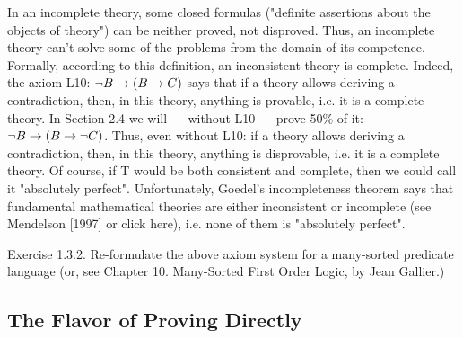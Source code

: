 In an incomplete theory, some closed formulas ("definite assertions about the objects of theory") can be
neither proved, not disproved. Thus, an incomplete theory can't solve some of the problems from the
domain of its competence.
Formally, according to this definition, an inconsistent theory is complete. Indeed, the axiom L10:
\(\neg B\rightarrow (B\rightarrow C)\) says that if a theory allows deriving a contradiction, then, in this theory, anything is
provable, i.e. it is a complete theory. In Section 2.4 we will --- without L10 --- prove 50\% of it:
\(\neg B\rightarrow (B\rightarrow \neg C)\). Thus, even without L10: if a theory allows deriving a contradiction, then, in this theory,
anything is disprovable, i.e. it is a complete theory.
Of course, if T would be both consistent and complete, then we could call it "absolutely perfect".
Unfortunately, Goedel's incompleteness theorem says that fundamental mathematical theories are
either inconsistent or incomplete (see Mendelson [1997] or click here), i.e. none of them is "absolutely
perfect".

Exercise 1.3.2. Re-formulate the above axiom system for a many-sorted predicate language (or, see Chapter 10. Many-Sorted First Order Logic, by Jean Gallier.)

\subsection{The Flavor of Proving Directly}

